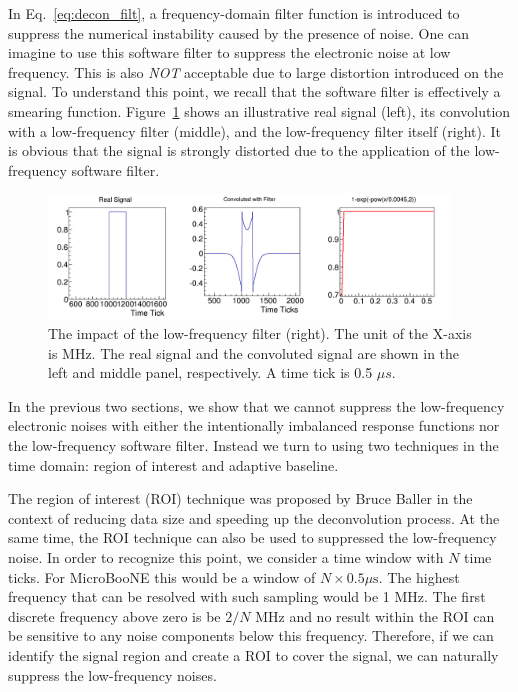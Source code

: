 \label{sec:low_freq_filter}

In Eq.~\eqref{eq:decon_filt}, a frequency-domain  filter function is introduced 
to suppress the numerical instability caused by the presence of noise. One can imagine to use this
software filter to suppress the electronic noise at low frequency. This is also 
{\it NOT} acceptable due to large distortion introduced on the signal. To understand this 
point, we recall that the software filter is effectively a smearing function. Figure~\ref{fig:low_f_filter} shows an illustrative 
real signal (left), its convolution with a low-frequency filter (middle), and 
the low-frequency filter itself (right). It is obvious that the signal is strongly 
distorted due to the application of the low-frequency software filter. 

\begin{figure}[htb]
\centering
\includegraphics[width=0.95\textwidth]{figures/low_freq.png}
\caption{The impact of the low-frequency filter (right). The unit of the X-axis 
is MHz.  The real signal and the convoluted signal are shown in the left and
middle panel, respectively. A time tick is 0.5 $\mu s$.}
\label{fig:low_f_filter}
\end{figure}

\label{sec:roi_ab}

In the previous two sections, we show that we cannot suppress the low-frequency 
electronic noises with either the intentionally imbalanced response functions nor 
the low-frequency software filter. 
Instead we turn to using two techniques in the time domain: region of interest and 
adaptive baseline. 

The region of interest (ROI) technique
was proposed by Bruce Baller in the context of reducing data size and speeding up the 
deconvolution process. At the same time, the ROI technique can also be used to 
suppressed the low-frequency noise. In order to recognize this point, we consider
a time window with $N$ time ticks.  For MicroBooNE this would be a window of $N\times0.5\mu\mbox{s}$.
The highest frequency that can be resolved with such sampling would be 
1 MHz. The first discrete frequency above zero is be $2/N$ MHz and no result
within the ROI can be sensitive 
to any noise components below this frequency.  Therefore, if we can identify 
the signal region and create a ROI to cover the signal, we can naturally suppress 
the low-frequency noises. 

